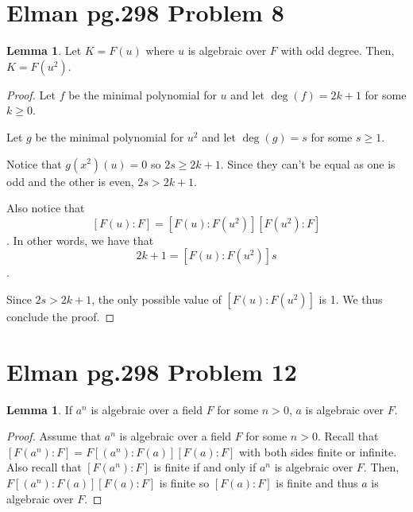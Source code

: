 \documentclass{article}
\theoremstyle{definition}
\newtheorem{lemma}[theorem]{Lemma}
\begin{document}
\newpage

\section{Elman pg.298 Problem 8}

\begin{lemma}
    Let $K = F(u)$ where $u$ is algebraic over $F$ with odd degree. Then, $K = F(u^{2})$.
\end{lemma}
\begin{proof}
    Let $f$ be the minimal polynomial for $u$ and let $\deg(f) = 2k+1$ for some $k \geq 0$.

    Let $g$ be the minimal polynomial for $u^{2}$ and let $\deg(g) = s$ for some $s \geq 1$.

    Notice that $g(x^{2})(u) = 0$ so $2s \geq 2k + 1$. Since they can't be equal as one is
    odd and the other is even, $2s > 2k + 1$.

    Also notice that \[ [F(u) : F] = [F(u) : F(u^{2})][F(u^{2}) : F] \]. In other words,
    we have that \[ 2k + 1 = [F(u) : F(u^{2})]s\].

    Since $2s > 2k + 1$, the only possible value of $[F(u) : F(u^{2})]$ is 1. We thus conclude the proof.
\end{proof}

\newpage

\section{Elman pg.298 Problem 12}

\begin{lemma}
    If $a^{n}$ is algebraic over a field $F$ for some $n > 0$, $a$ is algebraic over $F$.
\end{lemma}
\begin{proof}
    Assume that $a^{n}$ is algebraic over a field $F$ for some $n > 0$.
    Recall that $[F(a^{n}) : F] = F[(a^{n}) : F(a)][F(a): F]$ with both sides finite or infinite.
    Also recall that $[F(a^{n}) : F]$ is finite if and only if $a^{n}$ is algebraic over $F$.
    Then, $F[(a^{n}) : F(a)][F(a): F]$ is finite so $[F(a): F]$ is finite and thus $a$ is algebraic
    over $F$.
\end{proof}
\end{document}
